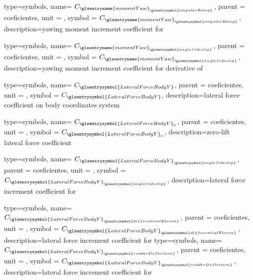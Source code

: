 {type=symbols,
    name= \ensuremath{C_{{\glsentryname{momentYaw}}_{\glsentrysymbol{angularRatep}}}},
    parent = {coeficientes},
    unit = \unexpanded{},
    symbol = \ensuremath{C_{{\glsentryname{momentYaw}}_{\glsentrysymbol{angularRatep}}}},
    description={yawing moment increment coefficient for }
}

{type=symbols,
    name= \ensuremath{C_{{\glsentryname{momentYaw}}_{\dot{\glsentrysymbol{angleSideslip}}}}},
    parent = {coeficientes},
    unit = \unexpanded{},
    symbol = \ensuremath{C_{{\glsentryname{momentYaw}}_{\dot{\glsentrysymbol{angleSideslip}}}}},    
    description={yawing moment increment coefficient for derivative of }
}


{type=symbols,
    name= \ensuremath{C_{\glsentrysymbol{LateralForceBodyY}}},
    parent = {coeficientes},
    unit = \unexpanded{},
    symbol = \ensuremath{C_{\glsentrysymbol{LateralForceBodyY}}},
    description={lateral force coefficient on body coordinates system }
}

{type=symbols,
    name= \ensuremath{C_{\glsentrysymbol{LateralForceBodyY}_{0}}},
    parent = {coeficientes},
    unit = \unexpanded{},
    symbol = \ensuremath{C_{\glsentrysymbol{LateralForceBodyY}_{0}}},
    description={zero-lift lateral force coefficient}
}

{type=symbols,
    name= \ensuremath{C_{{\glsentrysymbol{LateralForceBodyY}}_{\glsentrysymbol{angleSideslip}}}},
    parent = {coeficientes},
    unit = \unexpanded{},
    symbol = \ensuremath{C_{{\glsentrysymbol{LateralForceBodyY}}_{\glsentrysymbol{angleSideslip}}}},
    description={lateral force increment coefficient for }
}

{type=symbols,
    name= \ensuremath{C_{{\glsentrysymbol{LateralForceBodyY}}_{\glsentrysymbol{differentialElevon}}}},
    parent = {coeficientes},
    unit = \unexpanded{},
    symbol = \ensuremath{C_{{\glsentrysymbol{LateralForceBodyY}}_{\glsentrysymbol{differentialElevon}}}},
    description={lateral force increment coefficient for }
}
{type=symbols,
    name= \ensuremath{C_{{\glsentrysymbol{LateralForceBodyY}}_{\glsentrysymbol{rudderDeflection}}}},
    parent = {coeficientes},
    unit = \unexpanded{},
    symbol = \ensuremath{C_{{\glsentrysymbol{LateralForceBodyY}}_{\glsentrysymbol{rudderDeflection}}}},
    description={lateral force increment coefficient for }
}

